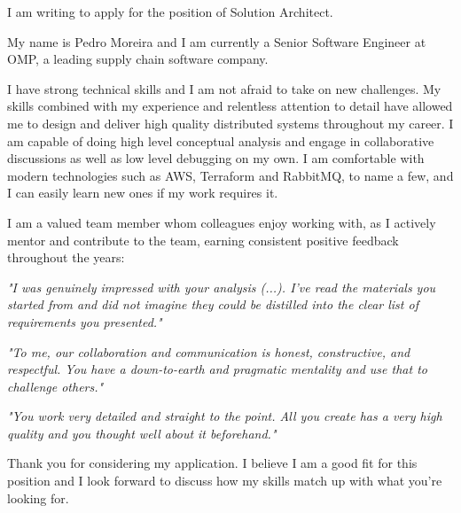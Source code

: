 I am writing to apply for the position of Solution Architect.

My name is Pedro Moreira and I am currently a Senior Software Engineer at OMP, a leading supply chain software company.

I have strong technical skills and I am not afraid to take on new challenges. My skills combined with my experience and relentless attention to detail have allowed me to design and deliver high quality distributed systems throughout my career. I am capable of doing high level conceptual analysis and engage in collaborative discussions as well as low level debugging on my own. I am comfortable with modern technologies such as AWS, Terraform and RabbitMQ, to name a few, and I can easily learn new ones if my work requires it.

I am a valued team member whom colleagues enjoy working with, as I actively mentor and contribute to the team, earning consistent positive feedback throughout the years:

\emph{"I was genuinely impressed with your analysis (...). I've read the materials you started from and did not imagine they could be distilled into the clear list of requirements you presented."}

\emph{"To me, our collaboration and communication is honest, constructive, and respectful. You have a down-to-earth and pragmatic mentality and use that to challenge others."}

\emph{"You work very detailed and straight to the point. All you create has a very high quality and you thought well about it beforehand."}

Thank you for considering my application. I believe I am a good fit for this position and I look forward to discuss how my skills match up with what you're looking for.
